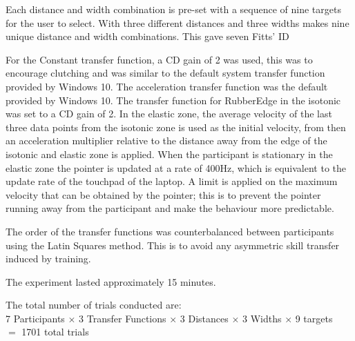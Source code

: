 Each distance and width combination is pre-set with a sequence of nine targets for the user to select. With three different distances and three widths makes nine unique distance and width combinations. This gave seven Fitts' \gls{ID}\cite{MacKenzie1992FittsInteraction}

For the Constant transfer function, a \gls{CD} gain of 2 was used, this was to encourage clutching and was similar to the default system transfer function provided by Windows 10. The acceleration transfer function was the default provided by Windows 10. The transfer function for RubberEdge in the isotonic was set to a \gls{CD} gain of 2. In the elastic zone, the average velocity of the last three data points from the isotonic zone is used as the initial velocity, from then an acceleration multiplier relative to the distance away from the edge of the isotonic and elastic zone is applied. When the participant is stationary in the elastic zone the pointer is updated at a rate of 400Hz, which is equivalent to the update rate of the touchpad of the laptop. A limit is applied on the maximum velocity that can be obtained by the pointer; this is to prevent the pointer running away from the participant and make the behaviour more predictable.

The order of the transfer functions was counterbalanced between participants using the Latin Squares method. This is to avoid any asymmetric skill transfer induced by training. 

The experiment lasted approximately 15 minutes.

The total number of trials conducted are:\\
7 Participants $\times$ 3 Transfer Functions $\times$ 3 Distances $\times$ 3 Widths $\times$ 9 targets\\
$=$ 1701 total trials